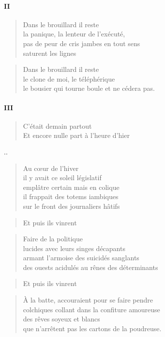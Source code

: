   \paragraph{II}
  \begin{verse}
    Dans le brouillard il reste\\
    la panique, la lenteur de l’exécuté,\\
    pas de peur de cris jambes en tout sens\\
    saturent les lignes
  \end{verse}
  \begin{verse}
    Dans le brouillard il reste\\
    le clone de moi, le téléphérique\\
    le bousier qui tourne boule et ne cédera pas.
  \end{verse}
  \paragraph{III}
  \begin{verse}
    C’était demain partout\\
    Et encore nulle part à l’heure d’hier
  \end{verse}
  \begin{center}
    {\Huge ..}
  \end{center}

  \begin{verse}
    Au cœur de l’hiver\\
    il y avait ce soleil législatif\\
    emplâtre certain mais en colique\\
    il frappait des totems iambiques\\
    sur le front des journaliers hâtifs
  \end{verse}
  \begin{verse}
    Et puis ils vinrent
  \end{verse}
  \begin{verse}
    Faire de la politique\\
    lucides avec leurs singes décapants\\
    armant l’armoise des suicidés sanglants\\
    des ouests acidulés au rênes des déterminants
  \end{verse}
  \begin{verse}
    Et puis ils vinrent
  \end{verse}
  \begin{verse}
    À la batte, accouraient pour se faire pendre\\
    colchiques collant dans la confiture amoureuse\\
    des rêves soyeux et blancs\\
    que n’arrêtent pas les cartons de la poudreuse.
  \end{verse}

